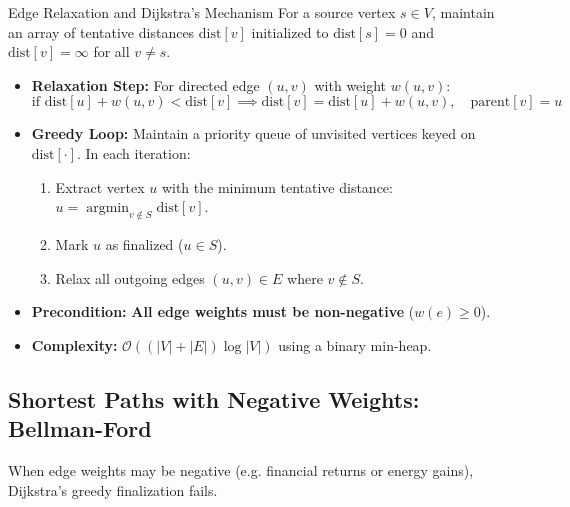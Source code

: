 \begin{definitionbox}{Edge Relaxation and Dijkstra's Mechanism}
For a source vertex $s \in V$, maintain an array of tentative distances $\text{dist}[v]$ initialized to $\text{dist}[s] = 0$ and $\text{dist}[v] = \infty$ for all $v \neq s$.
\begin{itemize}
    \item \textbf{Relaxation Step:} For directed edge $(u, v)$ with weight $w(u, v)$:
    \begin{equation}
    \text{if } \text{dist}[u] + w(u, v) < \text{dist}[v] \implies \text{dist}[v] = \text{dist}[u] + w(u, v), \quad \text{parent}[v] = u
    \end{equation}
    \item \textbf{Greedy Loop:} Maintain a priority queue of unvisited vertices keyed on $\text{dist}[\cdot]$. In each iteration:
    \begin{enumerate}
        \item Extract vertex $u$ with the minimum tentative distance: $u = \operatorname{argmin}_{v \notin S} \text{dist}[v]$.
        \item Mark $u$ as finalized ($u \in S$).
        \item Relax all outgoing edges $(u, v) \in E$ where $v \notin S$.
    \end{enumerate}
    \item \textbf{Precondition:} \textbf{All edge weights must be non-negative} ($w(e) \ge 0$).
    \item \textbf{Complexity:} $\mathcal{O}((|V| + |E|) \log |V|)$ using a binary min-heap.
\end{itemize}
\end{definitionbox}

\subsection{Shortest Paths with Negative Weights: Bellman-Ford}

When edge weights may be negative (e.g. financial returns or energy gains), Dijkstra's greedy finalization fails.

